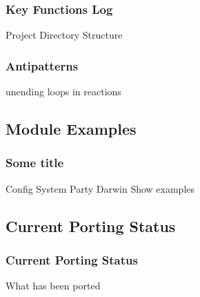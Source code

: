 \documentclass{beamer}
\begin{document}
\begin{frame}
    \frametitle{Key Functions Log}
	Project Directory Structure
\end{frame}

\begin{frame}
    \frametitle{Antipatterns}
	unending loops in reactions
\end{frame}

\subsection{Module Examples}
\begin{frame}
    \frametitle{Some title}
	Config System
	Party Darwin
	Show examples
\end{frame}

\subsection{Current Porting Status}
\begin{frame}
    \frametitle{Current Porting Status}
	What has been ported
\end{frame}
\end{document}
